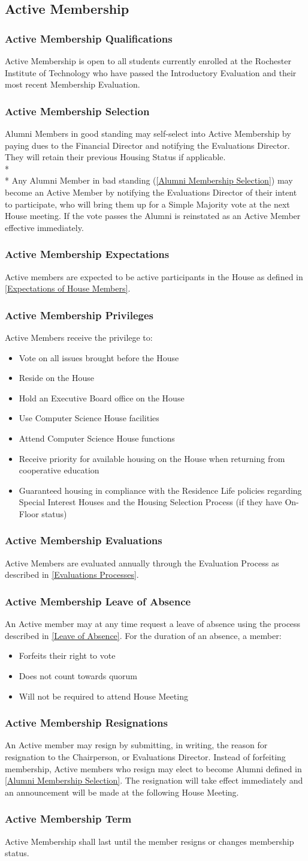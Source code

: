 \documentclass{article}
\newcommand{\asection}[1]{\subsection{#1} \label{#1}}
\newcommand{\asubsection}[1]{\subsubsection{#1} \label{#1}}
\begin{document}
\asection{Active Membership}
\asubsection{Active Membership Qualifications}
Active Membership is open to all students currently enrolled at the Rochester Institute of Technology who have passed the Introductory Evaluation and their most recent Membership Evaluation.
\asubsection{Active Membership Selection}
Alumni Members in good standing may self-select into Active Membership by paying dues to the Financial Director and notifying the Evaluations Director. They will retain their previous Housing Status if applicable.
\\*\\*
Any Alumni Member in bad standing (\ref{Alumni Membership Selection}) may become an Active Member by notifying the Evaluations Director of their intent to participate, who will bring them up for a Simple Majority vote at the next House meeting.
If the vote passes the Alumni is reinstated as an Active Member effective immediately.
\asubsection{Active Membership Expectations}
Active members are expected to be active participants in the House as defined in \ref{Expectations of House Members}.
\asubsection{Active Membership Privileges}
Active Members receive the privilege to:
\begin{itemize}
	\item Vote on all issues brought before the House
	\item Reside on the House
	\item Hold an Executive Board office on the House
	\item Use Computer Science House facilities
	\item Attend Computer Science House functions
	\item Receive priority for available housing on the House when returning from cooperative education
	\item Guaranteed housing in compliance with the Residence Life policies regarding Special Interest Houses and the Housing Selection Process (if they have On-Floor status)
\end{itemize}
\asubsection{Active Membership Evaluations}
Active Members are evaluated annually through the Evaluation Process as described in \ref{Evaluations Processes}.
\asubsection{Active Membership Leave of Absence}
An Active member may at any time request a leave of absence using the process described in \ref{Leave of Absence}.
For the duration of an absence, a member:
\begin{itemize}
	\item Forfeits their right to vote
	\item Does not count towards quorum
	\item Will not be required to attend House Meeting
\end{itemize}
\asubsection{Active Membership Resignations}
An Active member may resign by submitting, in writing, the reason for resignation to the Chairperson, or Evaluations Director.
Instead of forfeiting membership, Active members who resign may elect to become Alumni defined in \ref{Alumni Membership Selection}.
The resignation will take effect immediately and an announcement will be made at the following House Meeting.
\asubsection{Active Membership Term}
Active Membership shall last until the member resigns or changes membership status.
\end{document}
